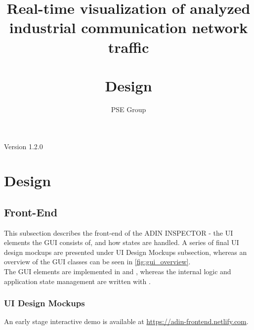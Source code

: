 \documentclass[oneside, english, final]{design}
\author{PSE Group}
\title{Real-time visualization of analyzed industrial communication network traffic\\ \hfill \\Design}
\begin{document}
\nocite{*}

\setpdf

\maketitle


\hfill

\begin{center}
	\large{Version 1.2.0}
\end{center}


\thispagestyle{empty}
\begin{abstract}
	\thispagestyle{empty}
\end{abstract}

\thispagestyle{empty}
\newpage
\thispagestyle{empty}
\tableofcontents
\cleardoublepage
\setcounter{page}{1}


\section{Design}\label{sec:intro}
\subsection{Front-End}
This subsection describes the front-end of the ADIN INSPECTOR - the UI elements the GUI consists of, and how states are handled. A series of final UI design mockups are presented under UI Design Mockups subsection, whereas an overview of the GUI classes can be seen in \autoref{fig:gui_overview}.\\

The GUI elements are implemented in \href{https://reactjs.org/}{\color{blue}{React}} and \href{https://material-ui.com/}{\color{blue}{Material UI}}, whereas the internal logic and application state management are written with \href{https://mobx.js.org/}{\color{blue}{MobX}}.

\subsubsection{UI Design Mockups}

An early stage interactive demo is available at \url{https://adin-frontend.netlify.com}.\\
\end{document}
